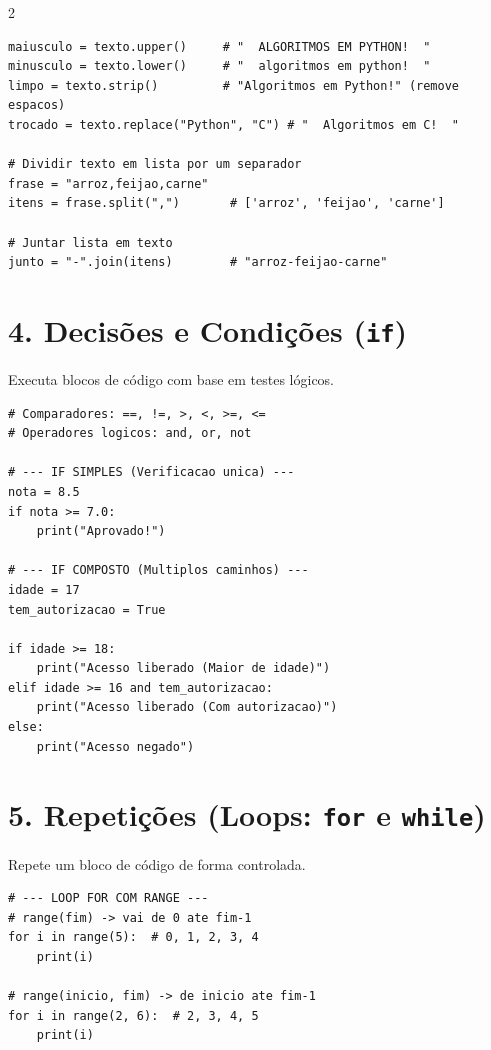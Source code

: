 \documentclass[10pt,a4paper]{article}
\begin{document}
\begin{multicols}{2}
\begin{minipage}{\linewidth}
\begin{lstlisting}
maiusculo = texto.upper()     # "  ALGORITMOS EM PYTHON!  "
minusculo = texto.lower()     # "  algoritmos em python!  "
limpo = texto.strip()         # "Algoritmos em Python!" (remove espacos)
trocado = texto.replace("Python", "C") # "  Algoritmos em C!  "

# Dividir texto em lista por um separador
frase = "arroz,feijao,carne"
itens = frase.split(",")       # ['arroz', 'feijao', 'carne']

# Juntar lista em texto
junto = "-".join(itens)        # "arroz-feijao-carne"
\end{lstlisting}
\end{minipage}
\vspace{0.4cm}

\noindent
\begin{minipage}{\linewidth}
\section*{4. Decisões e Condições (\texttt{if})}
Executa blocos de código com base em testes lógicos.
\begin{lstlisting}
# Comparadores: ==, !=, >, <, >=, <=
# Operadores logicos: and, or, not

# --- IF SIMPLES (Verificacao unica) ---
nota = 8.5
if nota >= 7.0:
    print("Aprovado!")

# --- IF COMPOSTO (Multiplos caminhos) ---
idade = 17
tem_autorizacao = True

if idade >= 18:
    print("Acesso liberado (Maior de idade)")
elif idade >= 16 and tem_autorizacao:
    print("Acesso liberado (Com autorizacao)")
else:
    print("Acesso negado")
\end{lstlisting}
\end{minipage}
\vspace{0.4cm}

\noindent
\begin{minipage}{\linewidth}
\section*{5. Repetições (Loops: \texttt{for} e \texttt{while})}
Repete um bloco de código de forma controlada.
\begin{lstlisting}
# --- LOOP FOR COM RANGE ---
# range(fim) -> vai de 0 ate fim-1
for i in range(5):  # 0, 1, 2, 3, 4
    print(i)

# range(inicio, fim) -> de inicio ate fim-1
for i in range(2, 6):  # 2, 3, 4, 5
    print(i)


\end{lstlisting}
\end{minipage}
\end{multicols}
\end{document}
